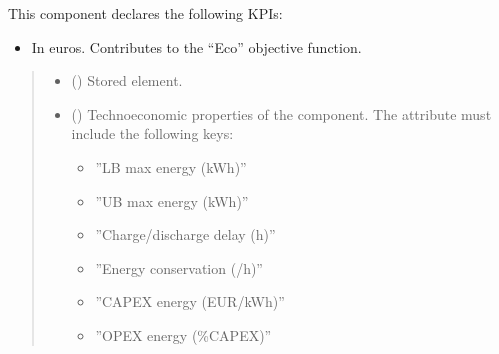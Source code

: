 \documentclass[letterpaper,10pt,english]{sphinxmanual}
\begin{document}
\begin{fulllineitems}
\begin{fulllineitems}
\begin{itemize}
\end{itemize}

\sphinxAtStartPar
This component declares the following KPIs:
\begin{itemize}
\item {} 
\sphinxAtStartPar
{}
In euros.
Contributes to the “Eco” objective function.

\end{itemize}
\begin{quote}\begin{description}
\begin{itemize}
\item {} 
\sphinxAtStartPar
{} ({\hyperref[\detokenize{generated/tamos.element.ElectricityVector:tamos.element.ElectricityVector}]{}}) \textendash{} Stored element.

\item {} 
\sphinxAtStartPar
{} (\sphinxstyleliteralemphasis{\sphinxupquote{ | }}) \textendash{} 
\sphinxAtStartPar
Techno\sphinxhyphen{}economic properties of the component.
The  attribute must include the following keys:
\begin{itemize}
\item {} 
\sphinxAtStartPar
”LB max energy (kWh)”

\item {} 
\sphinxAtStartPar
”UB max energy (kWh)”

\item {} 
\sphinxAtStartPar
”Charge/discharge delay (h)”

\item {} 
\sphinxAtStartPar
”Energy conservation (/h)”

\item {} 
\sphinxAtStartPar
”CAPEX energy (EUR/kWh)”

\item {} 
\sphinxAtStartPar
”OPEX energy (\%CAPEX)”

\end{itemize}



\end{itemize}
\end{description}
\end{quote}
\end{fulllineitems}
\end{fulllineitems}
\end{document}
